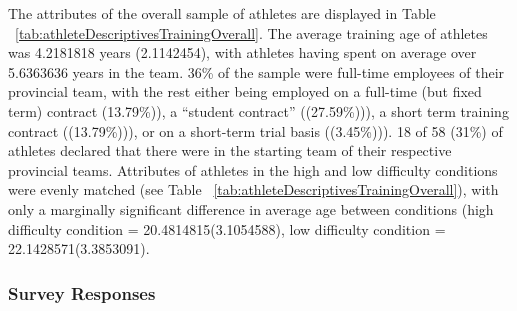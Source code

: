 \documentclass[english]{article}\usepackage[]{graphicx}\usepackage[]{color}
\makeatletter
\newenvironment{kframe}{%
 \def\at@end@of@kframe{}%
 \ifinner\ifhmode%
  \def\at@end@of@kframe{\end{minipage}}%
  \begin{minipage}{\columnwidth}%
 \fi\fi%
 \def\FrameCommand##1{\hskip\@totalleftmargin \hskip-\fboxsep
 \colorbox{shadecolor}{##1}\hskip-\fboxsep
     \hskip-\linewidth \hskip-\@totalleftmargin \hskip\columnwidth}%
 \MakeFramed {\advance\hsize-\width
   \@totalleftmargin\z@ \linewidth\hsize
   \@setminipage}}%
 {\par\unskip\endMakeFramed%
 \at@end@of@kframe}
\newenvironment{knitrout}{}{} %
\makeatother
\begin{document}
\begin{knitrout}
\color{fgcolor}\begin{kframe}


{\ttfamily\noindent\bfseries{}}\end{kframe}
\end{knitrout}









The attributes of the overall sample of athletes are displayed in Table ~\ref{tab:athleteDescriptivesTrainingOverall}. The average training age of athletes was 4.2181818 years (2.1142454), with athletes having spent on average over 5.6363636 years in the team.
36\% of the sample were full-time employees of their provincial team, with the rest either being employed on a full-time (but fixed term) contract
(13.79\%)), a ``student contract'' ((27.59\%))), a short term training contract
((13.79\%))), or on a short-term trial basis ((3.45\%))).
 18 of 58 (31\%) of athletes declared that there were in the starting team of their respective provincial teams.
Attributes of athletes in the high and low difficulty conditions were evenly matched (see Table ~\ref{tab:athleteDescriptivesTrainingOverall}), with only a marginally significant difference in average age between conditions (high difficulty condition = 20.4814815(3.1054588), low difficulty condition = 22.1428571(3.3853091).

\subsubsection{Survey Responses}
\end{document}
